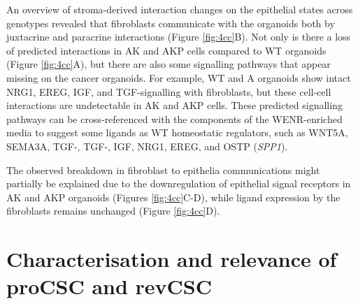 An overview of stroma-derived interaction changes on the epithelial states across genotypes revealed that fibroblasts communicate with the organoids both by juxtacrine and paracrine interactions (Figure \ref{fig:4cc}B). Not only is there a loss of predicted interactions in AK and AKP cells compared to WT organoids (Figure \ref{fig:4cc}A), but there are also some signalling pathways that appear missing on the cancer organoids. For example, WT and A organoids show intact NRG1, EREG, IGF, and TGF-\textbeta\hspace{0.1cm}signalling with fibroblasts, but these cell-cell interactions are undetectable in AK and AKP cells. These predicted signalling pathways can be cross-referenced with the components of the WENR-enriched media to suggest some ligands as WT homeostatic regulators, such as WNT5A, SEMA3A, TGF-, TGF-, IGF, NRG1, EREG, and OSTP (\textit{SPP1}).

The observed breakdown in fibroblast to epithelia communications might partially be explained due to the downregulation of epithelial signal receptors in AK and AKP organoids (Figures \ref{fig:4cc}C-D), while ligand expression by the fibroblasts remains unchanged (Figure \ref{fig:4cc}D).


\section{Characterisation and relevance of proCSC and revCSC}

